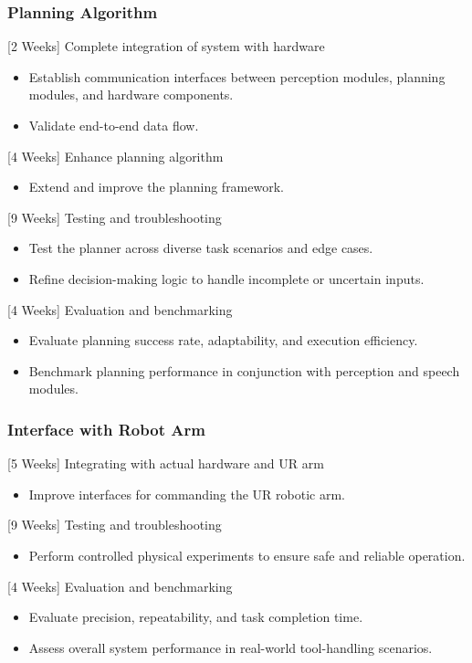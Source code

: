 \documentclass[12pt]{extarticle}
\begin{document}
\subsubsection{Planning Algorithm}
[2 Weeks] Complete integration of system with hardware
\begin{itemize}
\item Establish communication interfaces between perception modules, planning modules, and hardware components.
\item Validate end-to-end data flow.
\end{itemize}
[4 Weeks] Enhance planning algorithm
\begin{itemize}
\item Extend and improve the planning framework.
\end{itemize}
[9 Weeks] Testing and troubleshooting
\begin{itemize}
\item Test the planner across diverse task scenarios and edge cases.
\item Refine decision-making logic to handle incomplete or uncertain inputs.
\end{itemize}
[4 Weeks] Evaluation and benchmarking
\begin{itemize}
\item Evaluate planning success rate, adaptability, and execution efficiency.
\item Benchmark planning performance in conjunction with perception and speech modules.
\end{itemize}

\subsubsection{Interface with Robot Arm}
[5 Weeks] Integrating with actual hardware and UR arm
\begin{itemize}
\item Improve interfaces for commanding the UR robotic arm.
\end{itemize}
[9 Weeks] Testing and troubleshooting
\begin{itemize}
\item Perform controlled physical experiments to ensure safe and reliable operation.
\end{itemize}
[4 Weeks] Evaluation and benchmarking
\begin{itemize}
\item Evaluate precision, repeatability, and task completion time.
\item Assess overall system performance in real-world tool-handling scenarios.
\end{itemize}
\end{document}
